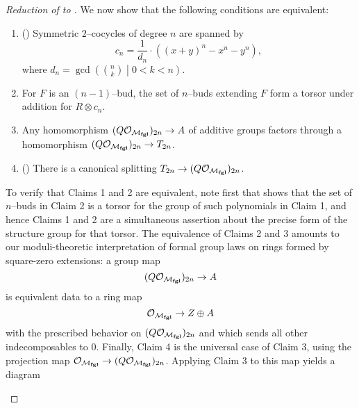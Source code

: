 \begin{proof}[{Reduction of  to }]
We now show that the following conditions are equivalent:
\begin{enumerate}
\item () Symmetric \(2\)--cocycles of degree \(n\) are spanned by \[c_n = \frac{1}{d_n} \cdot ((x + y)^n - x^n - y^n),\] where \(d_n = \gcd\left( \binom{n}{k} \middle| 0 < k < n \right)\).
\item For \(F\) is an \((n-1)\)--bud, the set of \(n\)--buds extending \(F\) form a torsor under addition for \(R \otimes c_n\).
\item Any homomorphism \((Q\mathcal O_{\mathcal{M}_{\mathbf{fgl}}})_{2n} \to A\) of additive groups factors through a homomorphism \((Q \mathcal O_{\mathcal{M}_{\mathbf{fgl}}})_{2n} \to T_{2n}\).
\item () There is a canonical splitting \(T_{2n} \to (Q \mathcal O_{\mathcal{M}_{\mathbf{fgl}}})_{2n}\).
\end{enumerate}

To verify that Claims 1 and 2 are equivalent, note first that  shows that the set of \(n\)--buds in Claim 2 is a torsor for the group of such polynomials in Claim 1, and hence Claims 1 and 2 are a simultaneous assertion about the precise form of the structure group for that torsor.  The equivalence of Claims 2 and 3 amounts to our moduli-theoretic interpretation of formal group laws on rings formed by square-zero extensions: a group map \[(Q\mathcal O_{\mathcal{M}_{\mathbf{fgl}}})_{2n} \to A\] is equivalent data to a ring map \[\mathcal O_{\mathcal{M}_{\mathbf{fgl}}} \to Z \oplus A\] with the prescribed behavior on \((Q\mathcal O_{\mathcal{M}_{\mathbf{fgl}}})_{2n}\) and which sends all other indecomposables to \(0\).  Finally, Claim 4 is the universal case of Claim 3, using the projection map \(\mathcal{O}_{\mathcal{M}_{\mathbf{fgl}}} \to (Q \mathcal{O}_{\mathcal{M}_{\mathbf{fgl}}})_{2n}\).  Applying Claim 3 to this map yields a diagram
\begin{center}
\end{center}
\end{proof}

